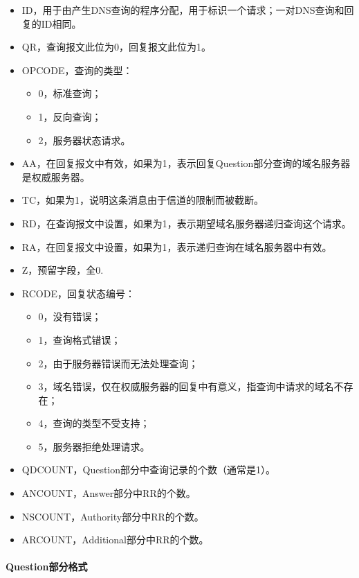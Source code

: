 \documentclass[lang=cn,11pt,a4paper,cite=authornum]{paper}
\begin{document}
\begin{itemize}
    \item ID，用于由产生DNS查询的程序分配，用于标识一个请求；一对DNS查询和回复的ID相同。
    \item QR，查询报文此位为0，回复报文此位为1。
    \item OPCODE，查询的类型：
        \begin{itemize}
            \item 0，标准查询；
            \item 1，反向查询；
            \item 2，服务器状态请求。
        \end{itemize}
    \item AA，在回复报文中有效，如果为1，表示回复Question部分查询的域名服务器是权威服务器。
    \item TC，如果为1，说明这条消息由于信道的限制而被截断。
    \item RD，在查询报文中设置，如果为1，表示期望域名服务器递归查询这个请求。
    \item RA，在回复报文中设置，如果为1，表示递归查询在域名服务器中有效。
    \item Z，预留字段，全0.
    \item RCODE，回复状态编号：
        \begin{itemize}
            \item 0，没有错误；
            \item 1，查询格式错误；
            \item 2，由于服务器错误而无法处理查询；
            \item 3，域名错误，仅在权威服务器的回复中有意义，指查询中请求的域名不存在；
            \item 4，查询的类型不受支持；
            \item 5，服务器拒绝处理请求。
        \end{itemize}
    \item QDCOUNT，Question部分中查询记录的个数（通常是1）。
    \item ANCOUNT，Answer部分中RR的个数。
    \item NSCOUNT，Authority部分中RR的个数。
    \item ARCOUNT，Additional部分中RR的个数。
\end{itemize}

\paragraph{Question部分格式}
\end{document}
